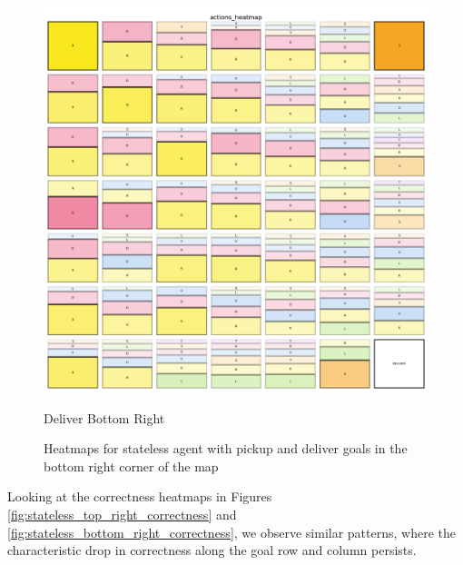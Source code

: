 \begin{figure}[!ht]
\begin{minipage}[b]{0.45\textwidth}
    \includegraphics[width=\textwidth]{
      images/results_discussion/stateless/not_central/stateless_deliver_bottom_right.png
    }
    \caption{Deliver Bottom Right}
    \label{fig:stateless_deliver_bottom_right}
  \end{minipage}
  \caption{Heatmaps for stateless agent with pickup and deliver goals in the
  bottom right corner of the map}
  \label{fig:stateless_bottom_right}
\end{figure}
\vspace{5mm}

Looking at the correctness heatmaps in Figures
\ref{fig:stateless_top_right_correctness} and
\ref{fig:stateless_bottom_right_correctness}, we observe similar patterns, where
the characteristic drop in correctness along the goal row and column persists.

